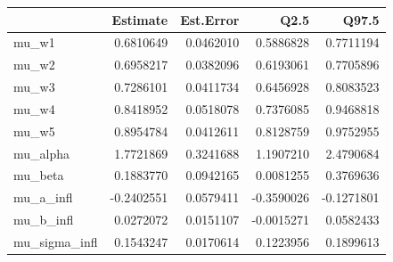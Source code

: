 
\begin{tabular}{lrrrr}
\toprule
  & Estimate & Est.Error & Q2.5 & Q97.5\\
\midrule
mu\_w1 & 0.6810649 & 0.0462010 & 0.5886828 & 0.7711194\\
mu\_w2 & 0.6958217 & 0.0382096 & 0.6193061 & 0.7705896\\
mu\_w3 & 0.7286101 & 0.0411734 & 0.6456928 & 0.8083523\\
mu\_w4 & 0.8418952 & 0.0518078 & 0.7376085 & 0.9468818\\
mu\_w5 & 0.8954784 & 0.0412611 & 0.8128759 & 0.9752955\\
\addlinespace
mu\_alpha & 1.7721869 & 0.3241688 & 1.1907210 & 2.4790684\\
mu\_beta & 0.1883770 & 0.0942165 & 0.0081255 & 0.3769636\\
mu\_a\_infl & -0.2402551 & 0.0579411 & -0.3590026 & -0.1271801\\
mu\_b\_infl & 0.0272072 & 0.0151107 & -0.0015271 & 0.0582433\\
mu\_sigma\_infl & 0.1543247 & 0.0170614 & 0.1223956 & 0.1899613\\
\bottomrule
\end{tabular}
